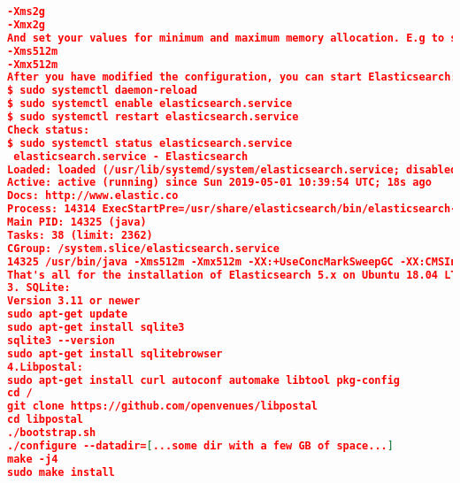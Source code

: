 \begin{lstlisting}[language=json,breaklines=true]
-Xms2g
-Xmx2g
And set your values for minimum and maximum memory allocation. E.g to set values to 512mb of ram, use:
-Xms512m
-Xmx512m
After you have modified the configuration, you can start Elasticsearch:
$ sudo systemctl daemon-reload
$ sudo systemctl enable elasticsearch.service
$ sudo systemctl restart elasticsearch.service
Check status:
$ sudo systemctl status elasticsearch.service 
 elasticsearch.service - Elasticsearch
Loaded: loaded (/usr/lib/systemd/system/elasticsearch.service; disabled; vendor preset: enabled)
Active: active (running) since Sun 2019-05-01 10:39:54 UTC; 18s ago
Docs: http://www.elastic.co
Process: 14314 ExecStartPre=/usr/share/elasticsearch/bin/elasticsearch-systemd-pre-exec (code=exited, status=0/SUCCESS)
Main PID: 14325 (java)
Tasks: 38 (limit: 2362)
CGroup: /system.slice/elasticsearch.service
14325 /usr/bin/java -Xms512m -Xmx512m -XX:+UseConcMarkSweepGC -XX:CMSInitiatingOccupancyFraction=75 -XX:+UseCMSInitiatingOccupancyOnly -X
That's all for the installation of Elasticsearch 5.x on Ubuntu 18.04 LTS (Bionic Beaver) Linux.
3. SQLite:
Version 3.11 or newer
sudo apt-get update
sudo apt-get install sqlite3
sqlite3 --version
sudo apt-get install sqlitebrowser
4.Libpostal: 
sudo apt-get install curl autoconf automake libtool pkg-config
cd /
git clone https://github.com/openvenues/libpostal
cd libpostal
./bootstrap.sh
./configure --datadir=[...some dir with a few GB of space...]
make -j4
sudo make install


\end{lstlisting}
